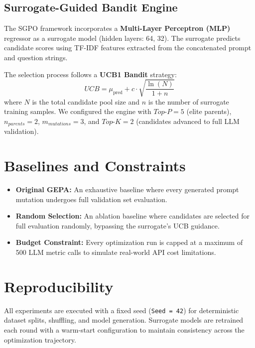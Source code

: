 \subsection{Surrogate-Guided Bandit Engine}
The SGPO framework incorporates a \textbf{Multi-Layer Perceptron (MLP)} regressor as a surrogate model (hidden layers: 64, 32). The surrogate predicts candidate scores using TF-IDF features extracted from the concatenated prompt and question strings. 

The selection process follows a \textbf{UCB1 Bandit} strategy:
\[ UCB = \mu_{\text{pred}} + c \cdot \sqrt{\frac{\ln(N)}{1 + n}} \]
where $N$ is the total candidate pool size and $n$ is the number of surrogate training samples. We configured the engine with $Top\text{-}P=5$ (elite parents), $n_{parents}=2$, $m_{mutations}=3$, and $Top\text{-}K=2$ (candidates advanced to full LLM validation).

\section{Baselines and Constraints}

\begin{itemize}
    \item \textbf{Original GEPA:} An exhaustive baseline where every generated prompt mutation undergoes full validation set evaluation.
    \item \textbf{Random Selection:} An ablation baseline where candidates are selected for full evaluation randomly, bypassing the surrogate's UCB guidance.
    \item \textbf{Budget Constraint:} Every optimization run is capped at a maximum of 500 LLM metric calls to simulate real-world API cost limitations.
\end{itemize}

\section{Reproducibility}
All experiments are executed with a fixed seed (\texttt{Seed = 42}) for deterministic dataset splits, shuffling, and model generation. Surrogate models are retrained each round with a warm-start configuration to maintain consistency across the optimization trajectory.
